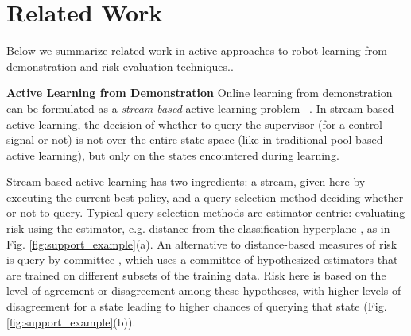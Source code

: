 \documentclass[10pt, conference]{ieeeconf}      %
\newcommand{\acro}{SHIV}
\begin{document}



\section{Related Work}
Below we summarize related work in active approaches to robot learning from demonstration and risk evaluation techniques.. 

\noindent\textbf{Active Learning from Demonstration}
Online learning from demonstration can be formulated as a \emph{stream-based} active learning problem ~\cite{atlas1990training,cohn1994improving}. In stream based active learning, the decision of whether to query the supervisor (for a control signal or not) is not over the entire state space (like in traditional pool-based active learning), but only on the states encountered during learning. 

Stream-based active learning has two ingredients: a stream, given here by executing the current best policy, and a query selection method deciding whether or not to query. Typical query selection methods are estimator-centric:  evaluating risk using the estimator, e.g. distance from the classification hyperplane \cite{tong2002support}, as in Fig. \ref{fig:support_example}(a). An alternative to distance-based measures of  risk is query by committee  \cite{breiman1996bagging}, which uses a committee of hypothesized estimators that are trained on different subsets of the training data. Risk here is based on the level of agreement or disagreement among these hypotheses, with higher levels of disagreement for a state leading to higher chances of querying that state (Fig. \ref{fig:support_example}(b)).
\end{document}

